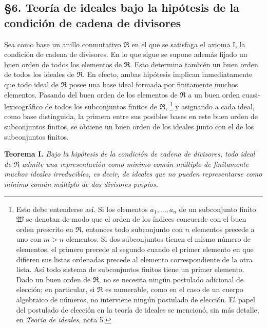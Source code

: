 \documentclass[11pt]{article}
\providecommand{\mR}{\mathfrak{R}}
\begin{document}
\setcounter{footnote}{25}

\subsection*{§6. Teoría de ideales bajo la hipótesis de la condición de cadena de divisores}

Sea como base un anillo conmutativo $\mR$ en el que se satisfaga el axioma I, la condición de cadena de divisores. En lo que sigue se supone además fijado un buen orden de todos los elementos de $\mR$. Esto determina también un buen orden de todos los ideales de $\mR$. En efecto, ambas hipótesis implican inmediatamente que todo ideal de $\mR$ posee una base ideal formada por finitamente muchos elementos. Pasando del buen orden de los elementos de $\mR$ a un buen orden cuasi-lexicográfico de todos los subconjuntos finitos de $\mR$,
\footnote{Esto debe entenderse así. Si los elementos $a_1,\ldots,a_n$ de un subconjunto finito $\mathfrak W$ se denotan de modo que el orden de los índices concuerde con el buen orden prescrito en $\mR$, entonces todo subconjunto con $n$ elementos precede a uno con $m>n$ elementos. Si dos subconjuntos tienen el mismo número de elementos, el primero precede al segundo cuando el primer elemento en que difieren sus listas ordenadas precede al elemento correspondiente de la otra lista. Así todo sistema de subconjuntos finitos tiene un primer elemento. Dado un buen orden de $\mR$, no se necesita ningún postulado adicional de elección; en particular, si $\mR$ es numerable, como en el caso de un cuerpo algebraico de números, no interviene ningún postulado de elección. El papel del postulado de elección en la teoría de ideales se mencionó, sin más detalle, en \emph{Teoría de ideales}, nota 5.}
y asignando a cada ideal, como base distinguida, la primera entre sus posibles bases en este buen orden de subconjuntos finitos, se obtiene un buen orden de los ideales junto con el de los subconjuntos finitos.

\textbf{Teorema I.} \emph{Bajo la hipótesis de la condición de cadena de divisores, todo ideal de $\mR$ admite una representación como mínimo común múltiplo de finitamente muchos ideales irreducibles, es decir, de ideales que no pueden representarse como mínimo común múltiplo de dos divisores propios.}
\end{document}
